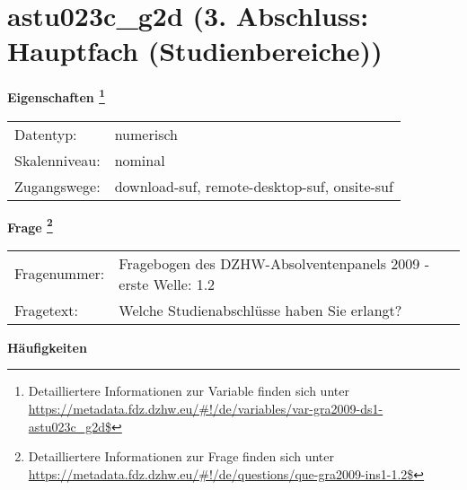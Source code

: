 
    \setcounter{footnote}{0}

    \vspace*{-1.8cm}
	\section{astu023c\_g2d (3. Abschluss: Hauptfach (Studienbereiche))}
	\label{section:astu023c_g2d}



    \vspace*{0.5cm}
    \noindent\textbf{Eigenschaften
	\footnote{Detailliertere Informationen zur Variable finden sich unter
		\url{https://metadata.fdz.dzhw.eu/\#!/de/variables/var-gra2009-ds1-astu023c_g2d$}}}\\
	\begin{tabularx}{\hsize}{@{}lX}
	Datentyp: & numerisch \\
	Skalenniveau: & nominal \\
	Zugangswege: &
	  download-suf, 
	  remote-desktop-suf, 
	  onsite-suf
 \\
    \end{tabularx}



				\vspace*{0.5cm}
                \noindent\textbf{Frage
	                \footnote{Detailliertere Informationen zur Frage finden sich unter
		              \url{https://metadata.fdz.dzhw.eu/\#!/de/questions/que-gra2009-ins1-1.2$}}}\\
				\begin{tabularx}{\hsize}{@{}lX}
					Fragenummer: &
					  Fragebogen des DZHW-Absolventenpanels 2009 - erste Welle:
					  1.2
 \\
					Fragetext: & Welche Studienabschlüsse haben Sie erlangt? \\
				\end{tabularx}





        		\vspace*{0.5cm}
                \noindent\textbf{Häufigkeiten}


